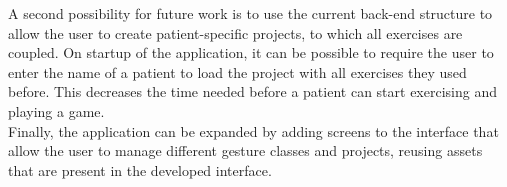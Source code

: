 A second possibility for future work is to use the current back-end structure to allow the user to create patient-specific projects, to which all exercises are coupled. On startup of the application, it can be possible to require the user to enter the name of a patient to load the project with all exercises they used before. This decreases the time needed before a patient can start exercising and playing a game.\\

Finally, the application can be expanded by adding screens to the interface that allow the user to manage different gesture classes and projects, reusing assets that are present in the developed interface.
